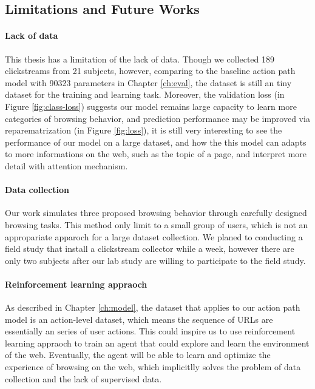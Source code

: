 \subsection{Limitations and Future Works}

\paragraph{Lack of data} 
This thesis has a limitation of the lack of data. 
Though we collected 189 clickstreams from 21 subjects, however, 
comparing to the baseline action path model with 90323 parameters in Chapter \ref{ch:eval},
the dataset is still an tiny dataset for the training and learning task.
Moreover, the validation loss (in Figure \ref{fig:class-loss}) suggests our model remains large capacity to learn more
categories of browsing behavior, and prediction performance may be improved
via reparematrization (in Figure \ref{fig:loss}), 
it is still very interesting to see the performance of our model on a large dataset,
and how the this model can adapts to more informations on the web, such as the topic of 
a page, and interpret more detail with attention mechanism.

\paragraph{Data collection}
Our work simulates three proposed browsing behavior through carefully designed browsing tasks.
This method only limit to a small group of users, which is not an appropariate apparoch for
a large dataset collection.
We planed to conducting a field study that install a clickstream collector while a week, 
however there are only two subjects after our lab study
are willing to participate to the field study.

\paragraph{Reinforcement learning appraoch}
As described in Chapter \ref{ch:model}, the dataset that applies to our action path model
is an action-level dataset, which means the sequence of URLs are essentially an series of 
user actions. This could inspire us to use reinforcement learning appraoch to train
an agent that could explore and learn the environment of the web. Eventually,
the agent will be able to learn and optimize the experience of browsing on the web,
which implicitlly solves the problem of data collection and the lack of supervised data.

